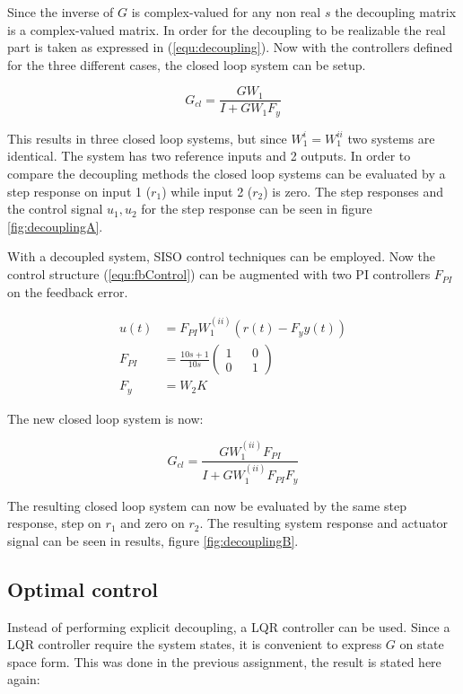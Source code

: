 \documentclass[a4paper, titlepage]{article}
\begin{document}
Since the inverse of $G$ is complex-valued for any non real $s$ the decoupling matrix is a complex-valued matrix.
In order for the decoupling to be realizable the real part is taken as expressed in (\ref{equ:decoupling}).
Now with the controllers defined for the three different cases, the closed loop system can be setup.

\begin{equation}
G_{cl} = \frac{GW_1}{I+GW_1F_y}
\label{equ:closedLoopDecoup}
\end{equation}

This results in three closed loop systems, but since $W^{i}_1 = W^{ii}_1$ two systems are identical.
The system has two reference inputs and 2 outputs.
In order to compare the decoupling methods the closed loop systems can be evaluated by a step response on input 1 ($r_1$) while input 2 ($r_2$) is zero.
The step responses and the control signal $u_1, u_2$ for the step response can be seen in figure \ref{fig:decouplingA}.

With a decoupled system, SISO control techniques can be employed.
Now the control structure (\ref{equ:fbControl}) can be augmented with two PI controllers $F_{PI}$ on the feedback error.

\begin{equation}
\begin{split}
u(t) &= F_{PI}W^{(ii)}_1(r(t) - F_yy(t)) \\
F_{PI} &= \frac{10s+1}{10s}
\begin{pmatrix}
1 && 0 \\ 0 && 1
\end{pmatrix} \\
F_y &= W_2K
\end{split}
\end{equation}

The new closed loop system is now:

\begin{equation}
G_{cl} = \frac{GW^{(ii)}_1F_{PI}}{I+GW^{(ii)}_1F_{PI}F_y}
\end{equation}

The resulting closed loop system can now be evaluated by the same step response, step on $r_1$ and zero on $r_2$.
The resulting system response and actuator signal can be seen in results, figure \ref{fig:decouplingB}.

\subsection{Optimal control}
Instead of performing explicit decoupling, a LQR controller can be used.
Since a LQR controller require the system states, it is convenient to express $G$ on state space form.
This was done in the previous assignment, the result is stated here again:
\end{document}
